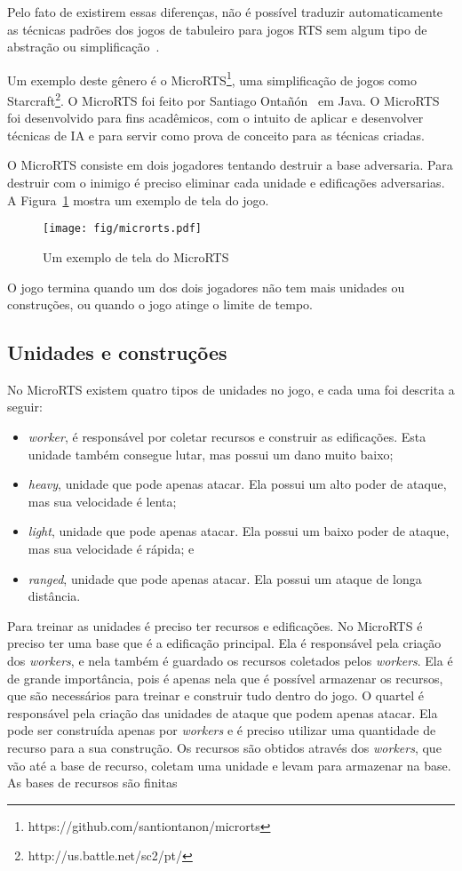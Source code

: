 Pelo fato de existirem essas diferenças, não é possível traduzir automaticamente as técnicas padrões dos jogos de tabuleiro para jogos RTS sem algum tipo de abstração ou simplificação~\cite{ontanon2013survey}.

Um exemplo deste gênero é o MicroRTS\footnote{https://github.com/santiontanon/microrts}, uma simplificação de jogos como Starcraft\footnote{http://us.battle.net/sc2/pt/}. O MicroRTS foi feito por Santiago Ontañón~\cite{ontanon2013combinatorial} em Java. O MicroRTS foi desenvolvido para fins acadêmicos, com o intuito de aplicar e desenvolver técnicas de IA e para servir como prova de conceito para as técnicas criadas.

O MicroRTS consiste em dois jogadores tentando destruir a base adversaria. Para destruir com o inimigo é preciso eliminar cada unidade e edificações adversarias. A Figura~\ref{fig:microrts} mostra um exemplo de tela do jogo.

\begin{figure}[ht]
	\centering
	\texttt{[image: fig/microrts.pdf]}
	\caption{Um exemplo de tela do MicroRTS}
	\label{fig:microrts}
\end{figure} 

O jogo termina quando um dos dois jogadores não tem mais unidades ou construções, ou quando o jogo atinge o limite de tempo. 

\subsection{Unidades e construções}
No MicroRTS existem quatro tipos de unidades no jogo, e cada uma foi descrita a seguir:

\begin{itemize}
	\item \textit{worker}, é responsável por coletar recursos e construir as edificações. Esta unidade também consegue lutar, mas possui um dano muito baixo;
	\item \textit{heavy}, unidade que pode apenas atacar. Ela possui um alto poder de ataque, mas sua velocidade é lenta;
	\item \textit{light}, unidade que pode apenas atacar. Ela possui um baixo poder de ataque, mas sua velocidade é rápida; e
	\item \textit{ranged}, unidade que pode apenas atacar. Ela possui um ataque de longa distância. 
\end{itemize} 

Para treinar as unidades é preciso ter recursos e edificações. No MicroRTS é preciso ter uma base que é a edificação principal. Ela é responsável pela criação dos \textit{workers}, e nela também é guardado os recursos coletados pelos \textit{workers}. Ela é de grande importância, pois é apenas nela que é possível armazenar os recursos, que são necessários para treinar e construir tudo dentro do jogo. O quartel é responsável pela criação das unidades de ataque que podem apenas atacar. Ela pode ser construída apenas por \textit{workers} e é preciso utilizar uma quantidade de recurso para a sua construção. Os recursos são obtidos através dos \textit{workers}, que vão até a base de recurso, coletam uma unidade e levam para armazenar na base. As bases de recursos são finitas

